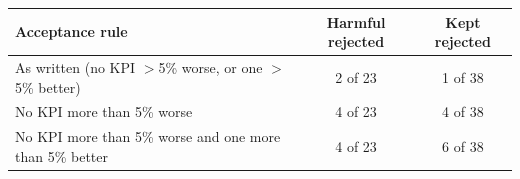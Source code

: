 \begin{tabular}{@{}p{4.2cm}cc@{}}
\toprule
Acceptance rule & Harmful rejected & Kept rejected \\
\midrule
As written (no KPI $>$5\% worse, or one $>$5\% better) & 2 of 23 & 1 of 38 \\
No KPI more than 5\% worse & 4 of 23 & 4 of 38 \\
No KPI more than 5\% worse and one more than 5\% better & 4 of 23 & 6 of 38 \\
\bottomrule
\end{tabular}
